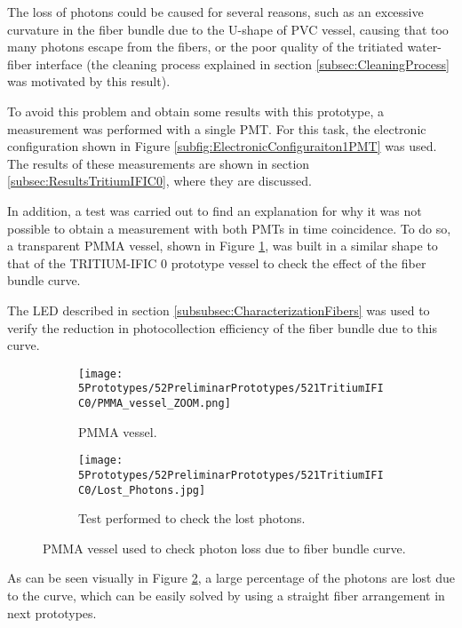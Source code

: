 The loss of photons could be caused for several reasons, such as an excessive curvature in the fiber bundle due to the U-shape of PVC vessel, causing that too many photons escape from the fibers, or the poor quality of the tritiated water-fiber interface (the cleaning process explained in section \ref{subsec:CleaningProcess} was motivated by this result).

To avoid this problem and obtain some results with this prototype, a measurement was performed with a single PMT. For this task, the electronic configuration shown in Figure \ref{subfig:ElectronicConfiguraiton1PMT} was used. The results of these measurements are shown in section \ref{subsec:ResultsTritiumIFIC0}, where they are discussed.

In addition, a test was carried out to find an explanation for why it was not possible to obtain a measurement with both PMTs in time coincidence. To do so, a transparent PMMA vessel, shown in Figure \ref{subfig:PMMAVesselToTestLostPhotons}, was built in a similar shape to that of the TRITIUM-IFIC 0 prototype vessel to check the effect of the fiber bundle curve. 

The LED described in section \ref{subsubsec:CharacterizationFibers} was used to verify the reduction in photocollection efficiency of the fiber bundle due to this curve. 

\begin{figure}
\centering
    \begin{subfigure}[b]{0.45\textwidth}
    \centering
    \texttt{[image: 5Prototypes/52PreliminarPrototypes/521TritiumIFIC0/PMMA\_vessel\_ZOOM.png]}  
    \caption{PMMA vessel.\label{subfig:PMMAVesselToTestLostPhotons}}
    \end{subfigure}
    \hfill
    \begin{subfigure}[b]{0.45\textwidth}
    \centering
    \texttt{[image: 5Prototypes/52PreliminarPrototypes/521TritiumIFIC0/Lost\_Photons.jpg]}  
    \caption{Test performed to check the lost photons.\label{subfig:TestLostPhotons}}
    \end{subfigure}
 \caption{PMMA vessel used to check photon loss due to fiber bundle curve.}
 \label{fig:TestLostPhotons}
\end{figure}

As can be seen visually in Figure \ref{subfig:TestLostPhotons}, a large percentage of the photons are lost due to the curve, which can be easily solved by using a straight fiber arrangement in next prototypes.


